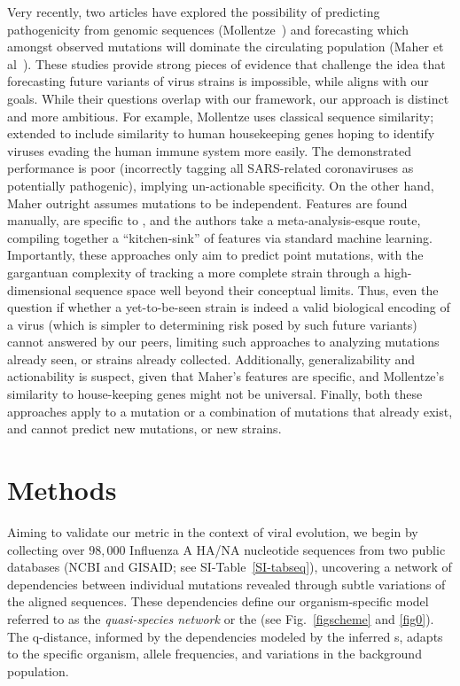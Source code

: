 \documentclass[onecolumn, compsoc,10pt]{IEEEtran}
\begin{document}
Very recently, two articles have explored the possibility of predicting  pathogenicity from genomic sequences (Mollentze~\cite{mollentze2021identifying}) and forecasting which amongst observed mutations will dominate the circulating population (Maher et al~\cite{maher2021predicting}). These studies provide strong pieces of evidence that challenge the idea that forecasting future variants of virus strains is impossible, while aligns with our goals. While their questions overlap with our framework, our approach is distinct and more ambitious. For example,  Mollentze  uses  classical  sequence similarity; extended to include similarity to  human housekeeping genes hoping to identify viruses  evading the human immune system more easily.  The demonstrated  performance is poor (incorrectly tagging all SARS-related coronaviruses as potentially pathogenic), implying un-actionable specificity. On the other hand,  Maher outright assumes mutations to be independent. Features are found manually,  are specific to \hcov, and the authors take  a meta-analysis-esque route, compiling together a ``kitchen-sink'' of features via standard machine learning. Importantly, these approaches  only aim to predict point mutations, with  the gargantuan complexity of tracking a more complete strain through a high-dimensional sequence space well beyond their conceptual limits. Thus, even the question if whether a yet-to-be-seen strain is indeed a valid biological encoding of a virus (which is simpler to determining risk posed by such future variants) cannot answered by our peers, limiting such approaches to analyzing mutations already seen, or strains  already collected.  Additionally, generalizability and actionability is  suspect, given that Maher's features are \hcov specific, and Mollentze's similarity to house-keeping genes might not be universal. Finally, both these  approaches apply to a mutation or a combination of mutations that already exist, and cannot predict new mutations, or new strains.





\section*{Methods}

Aiming to validate our metric in the context of  viral evolution, we begin by collecting over $98,000$ Influenza A HA/NA nucleotide sequences from two public databases (NCBI %
and GISAID; %
see SI-Table~\ref{SI-tabseq}), uncovering a network of  dependencies between individual mutations revealed through subtle variations of the aligned sequences. These dependencies define our organism-specific model referred to as the \textit{quasi-species network} or the \qnet (see Fig.~\ref{figscheme} and \ref{fig0}). The q-distance, informed by the dependencies modeled by the inferred {\qnet}s, adapts to the specific organism, allele frequencies, and variations in the background population. 
\end{document}
